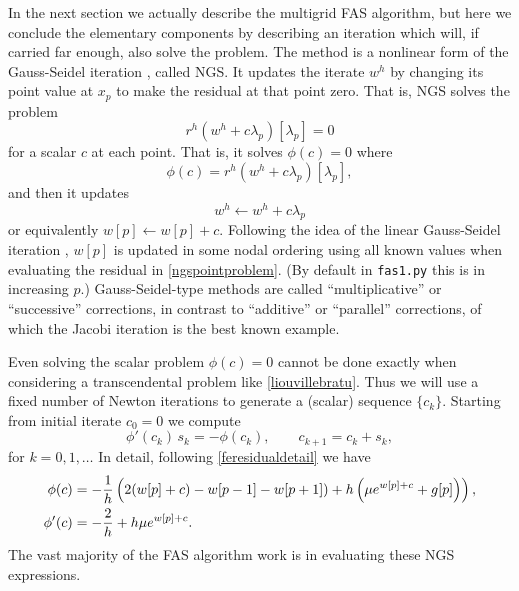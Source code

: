 \documentclass[letterpaper,final,12pt,reqno]{amsart}
\begin{document}
In the next section we actually describe the multigrid FAS algorithm, but here we conclude the elementary components by describing an iteration which will, if carried far enough, also solve the problem.  The method is a nonlinear form of the Gauss-Seidel iteration \cite{Briggsetal2000}, called NGS.  It updates the iterate $w^h$ by changing its point value at $x_p$ to make the residual at that point zero.  That is, NGS solves the problem
\begin{equation}
r^h(w^h + c \lambda_p)[\lambda_p] = 0  \label{ngspointproblem}
\end{equation}
for a scalar $c$ at each point.  That is, it solves $\phi(c)=0$ where
\begin{equation}
  \phi(c) = r^h(w^h + c \lambda_p)[\lambda_p], \label{ngspointresidual}
\end{equation}
and then it updates
\begin{equation}
  w^h \leftarrow w^h + c \lambda_p  \label{ngspointupdate}
\end{equation}
or equivalently $w[p] \leftarrow w[p] + c$.  Following the idea of the linear Gauss-Seidel iteration \cite{Greenbaum1997}, $w[p]$ is updated in some nodal ordering using all known values when evaluating the residual in \eqref{ngspointproblem}.  (By default in \texttt{fas1.py} this is in increasing $p$.)  Gauss-Seidel-type methods are called ``multiplicative'' or ``successive'' corrections, in contrast to ``additive'' or ``parallel'' corrections, of which the Jacobi iteration is the best known example.

Even solving the scalar problem $\phi(c)=0$ cannot be done exactly when considering a transcendental problem like \eqref{liouvillebratu}.  Thus we will use a fixed number of Newton iterations to generate a (scalar) sequence $\{c_k\}$.  Starting from initial iterate $c_0=0$ we compute
\begin{equation}
\phi'(c_k)\, s_k = -\phi(c_k),  \qquad  c_{k+1} = c_k + s_k, \label{ngsnewton}
\end{equation}
for $k=0,1,\dots$  In detail, following \eqref{feresidualdetail} we have
\begin{align}
   \phi(c) &= -\frac{1}{h} \left(2(w[p]+c) - w[p-1] - w[p+1]) + h \left(\mu e^{w[p]+c} + g[p]\right)\right), \label{ngsnewtondetails} \\
   \phi'(c) &= -\frac{2}{h} + h \mu e^{w[p]+c}. \notag
\end{align}
The vast majority of the FAS algorithm work is in evaluating these NGS expressions.
\end{document}
